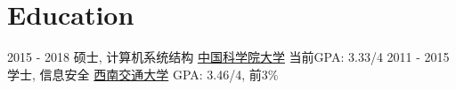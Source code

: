 \documentclass[letterpaper]{twentysecondcv} %
\begin{document}
\section{Education}

\begin{twenty} %
	\twentyitem
	{2015 - 2018}
	{硕士, 计算机系统结构}
	{\href{http://english.cas.cn/}{中国科学院大学}}
	{}
	{当前GPA: 3.33/4}
	\twentyitem
	{2011 - 2015}
	{学士, 信息安全}
	{\href{http://english.swjtu.edu.cn/}{西南交通大学}}
	{}
	{GPA: 3.46/4, 前3\%}
\end{twenty}
\end{document}
